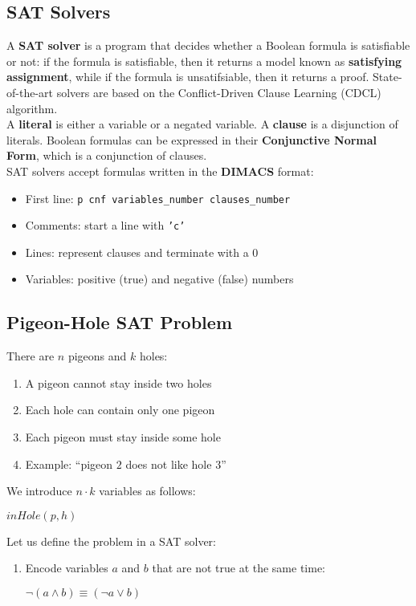 \documentclass{article}
\begin{document}
\subsection{SAT Solvers}
A \textbf{SAT solver} is a program that decides whether a Boolean formula is satisfiable or not: if the formula is satisfiable, then it returns a model known as \textbf{satisfying assignment}, while if the formula is unsatifsiable, then it returns a proof. State-of-the-art solvers are based on the Conflict-Driven Clause Learning (CDCL) algorithm. \\
A \textbf{literal} is either a variable or a negated variable. A \textbf{clause} is a disjunction of literals. Boolean formulas can be expressed in their \textbf{Conjunctive Normal Form}, which is a conjunction of clauses. \\
SAT solvers accept formulas written in the \textbf{DIMACS} format:
\begin{itemize}
    \item First line: \texttt{p cnf variables\_number clauses\_number}
    \item Comments: start a line with \texttt{'c'}
    \item Lines: represent clauses and terminate with a $0$
    \item Variables: positive (true) and negative (false) numbers
\end{itemize}
\subsection{Pigeon-Hole SAT Problem}
There are $n$ pigeons and $k$ holes:
\begin{enumerate}
    \item A pigeon cannot stay inside two holes
    \item Each hole can contain only one pigeon
    \item Each pigeon must stay inside some hole
    \item Example: “pigeon $2$ does not like hole $3$”
\end{enumerate}
We introduce $n\cdot k$ variables as follows:
\begin{center}
    $inHole(p,h)$
\end{center}
Let us define the problem in a SAT solver:
\begin{enumerate}
    \item Encode variables $a$ and $b$ that are not true at the same time:
    \begin{center}
        $\neg(a \land b) \equiv (\neg a\lor b)$
    \end{center}
\end{enumerate}
\end{document}
